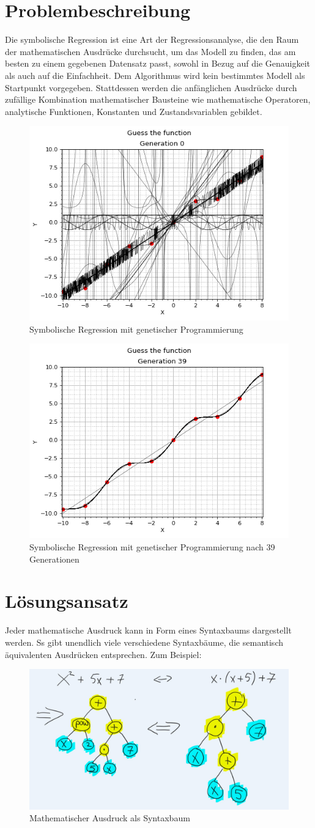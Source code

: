 \documentclass[ngerman]{article}
\begin{document}
	\section{Problembeschreibung}
Die symbolische Regression ist eine Art der Regressionsanalyse, die den Raum der mathematischen Ausdrücke durchsucht, um das Modell zu finden, das am besten zu einem gegebenen Datensatz passt, sowohl in Bezug auf die Genauigkeit als auch auf die Einfachheit. Dem Algorithmus wird kein bestimmtes Modell als Startpunkt vorgegeben. Stattdessen werden die anfänglichen Ausdrücke durch zufällige Kombination mathematischer Bausteine wie mathematische Operatoren, analytische Funktionen, Konstanten und Zustandsvariablen gebildet.

\begin{figure}[h]
	\centering
	\includegraphics[width=0.2\linewidth]{images/foo-0.png}
	\caption{Symbolische Regression mit genetischer Programmierung}
	\label{fig::sym}
\end{figure}
\begin{figure}[h]
\centering
\includegraphics[width=0.2\linewidth]{images/foo-39.png}
\caption{Symbolische Regression mit genetischer Programmierung nach 39 Generationen}
\label{fig::gen}
\end{figure}
\section{Lösungsansatz}
Jeder mathematische Ausdruck kann in Form eines Syntaxbaums dargestellt werden. Ss gibt unendlich viele verschiedene Syntaxbäume, die semantisch äquivalenten Ausdrücken entsprechen. Zum Beispiel:
\begin{figure}[h]
	 \centering
	\includegraphics[width=0.4\linewidth]{matextree.jpg}
	\caption{Mathematischer Ausdruck als Syntaxbaum}
	\label{fig::matextree}
\end{figure}
\end{document}
